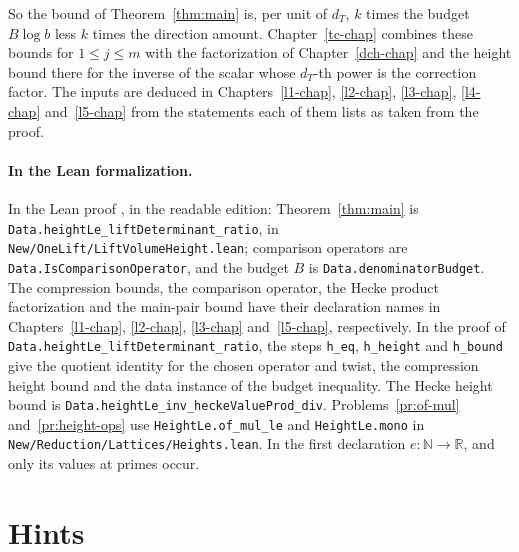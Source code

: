 \documentclass[reqno]{amsart}
\newcounter{chap}
\theoremstyle{definition}
\theoremstyle{plain}
\newcommand{\R}{{\mathbb{R}}}
\newcommand{\N}{{\mathbb{N}}}
\newcommand{\tl}[1]{\texttt{#1}}
\begin{document}
So the bound of Theorem~\ref{thm:main} is, per unit of \(d_T\), \(k\) times the budget \(B\log b\) less \(k\) times the direction amount.  Chapter~\ref{tc-chap} combines these bounds for \(1\le j\le m\) with the factorization of Chapter~\ref{dch-chap} and the height bound there for the inverse of the scalar whose \(d_T\)-th power is the correction factor.  The inputs are deduced in Chapters~\ref{l1-chap}, \ref{l2-chap}, \ref{l3-chap}, \ref{l4-chap} and~\ref{l5-chap} from the statements each of them lists as taken from the proof.

{\raggedright
\paragraph{In the Lean formalization.}
In the Lean proof \cite{GL}, in the readable edition: Theorem~\ref{thm:main} is \tl{Data.heightLe\_liftDeterminant\_ratio}, in \tl{New/OneLift/LiftVolumeHeight.lean}; comparison operators are \tl{Data.IsComparisonOperator}, and the budget \(B\) is \tl{Data.denominatorBudget}.  The compression bounds, the comparison operator, the Hecke product factorization and the main-pair bound have their declaration names in Chapters~\ref{l1-chap}, \ref{l2-chap}, \ref{l3-chap} and~\ref{l5-chap}, respectively.  In the proof of \tl{Data.heightLe\_liftDeterminant\_ratio}, the steps \tl{h\_eq}, \tl{h\_height} and \tl{h\_bound} give the quotient identity for the chosen operator and twist, the compression height bound and the data instance of the budget inequality.  The Hecke height bound is \tl{Data.heightLe\_inv\_heckeValueProd\_div}.  Problems~\ref{pr:of-mul} and~\ref{pr:height-ops} use \tl{HeightLe.of\_mul\_le} and \tl{HeightLe.mono} in \tl{New/Reduction/Lattices/Heights.lean}.  In the first declaration \(e\colon\N\to\R\), and only its values at primes occur.\par}

\section*{Hints}
\end{document}
